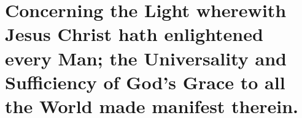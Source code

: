 \documentclass[../main.tex]{subfiles}
\begin{document}
	
	\chapter{Concerning the Light wherewith Jesus Christ hath enlightened every Man; the Universality and Sufficiency of God's Grace to all the World made manifest therein.}
	
	
	
	\theendnotes
	\setcounter{endnote}{0}
\end{document}
